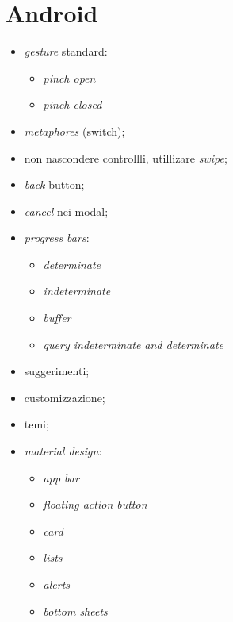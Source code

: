 \section{Android}
\begin{itemize}
	\item \textit{gesture} standard:
	\begin{itemize}
		\item \textit{pinch open}
		\item \textit{pinch closed}
	\end{itemize}
	\item \textit{metaphores} (switch);
	\item non nascondere controllli, utillizare \textit{swipe};
	\item \textit{back} button;
	\item \textit{cancel} nei modal;
	\item \textit{progress bars}:
	\begin{itemize}
		\item \textit{determinate}
		\item \textit{indeterminate}
		\item \textit{buffer}
		\item \textit{query indeterminate and determinate}
	\end{itemize}
	\item suggerimenti;
	\item customizzazione;
	\item temi;
	\item \textit{material design}:
	\begin{itemize}
		\item \textit{app bar}
		\item \textit{floating action button}
		\item \textit{card}
		\item \textit{lists}
		\item \textit{alerts}
		\item \textit{bottom sheets}
	\end{itemize}
\end{itemize}


